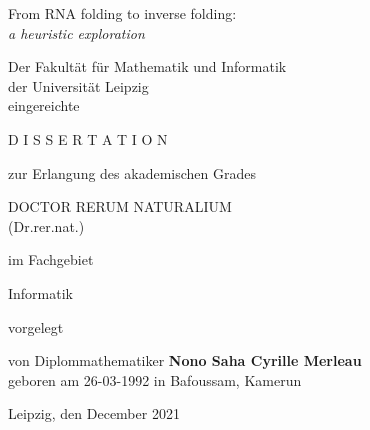 \thispagestyle{empty}
{\Large
\begin{center}
	From RNA folding to  inverse folding:\\
	\textit{a heuristic exploration}
\end{center}}
\vspace*{0.7cm}
\begin{center}
Der Fakult\"at f\"ur Mathematik und Informatik\\
der Universit\"at Leipzig\\
eingereichte
\end{center}
\vspace*{0.7cm}
\begin{center}
D I S S E R T A T I O N
\end{center}
\vspace*{0.7cm}
\begin{center}
zur Erlangung des akademischen Grades
\end{center}

\begin{center}
DOCTOR RERUM NATURALIUM\\
(Dr.rer.nat.)
\end{center}
\vspace*{0.5cm}
\begin{center}
im Fachgebiet 
\end{center}
\begin{center}
Informatik
\end{center}
\begin{center}
vorgelegt 
\end{center}
\vspace*{0.7cm}
\begin{center}
von Diplommathematiker \textbf{Nono Saha Cyrille Merleau}\\
geboren am 26-03-1992 \hspace{0em} in Bafoussam, Kamerun
\end{center}
\vspace{1cm}

\begin{center}
Leipzig, den {December 2021}
\end{center}

